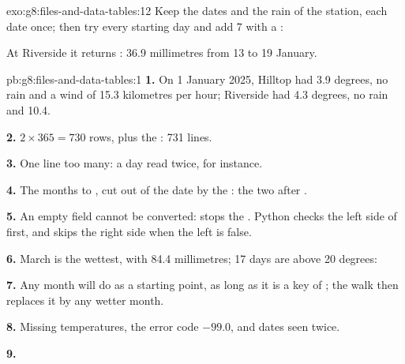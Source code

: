 \begin{solution}{exo:g8:files-and-data-tables:12}
Keep the dates and the rain of the station, each date once; then try every
starting day and add 7  with a :

\label{lst:g8:files-and-data-tables:sol-rainiest}

At Riverside it returns : 36.9 millimetres from 13
to 19 January.
\end{solution}

\begin{solution}{pb:g8:files-and-data-tables:1}
\textbf{1.} On 1 January 2025, Hilltop had 3.9 degrees, no rain and a wind of
15.3 kilometres per hour; Riverside had 4.3 degrees, no rain and 10.4.

\textbf{2.} $2 \times 365 = 730$ rows, plus the : 731 lines.

\textbf{3.} One line too many: a day read twice, for instance.

\textbf{4.} The months  to , cut out of the date by the
 \code{[5:7]}: the two  after .

\textbf{5.} An empty field cannot be converted:  stops the
. Python checks the left side of  first, and skips the right
side when the left is false.

\textbf{6.} March is the wettest, with 84.4 millimetres; 17 days are above 20
degrees:

\label{out:g8:files-and-data-tables:weather-year}

\textbf{7.} Any month will do as a starting point, as long as it is a key of
; the walk then replaces it by any wetter month.

\textbf{8.} Missing temperatures, the error code $-99.0$, and dates seen
twice.

\textbf{9.}

\label{out:g8:files-and-data-tables:defects}


\end{solution}

